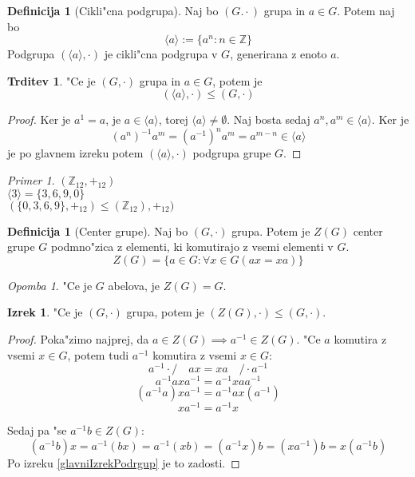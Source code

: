 \documentclass[11pt, a4paper]{article}
\theoremstyle{definition}
\newtheorem{defn}[counter]{Definicija}
\newtheorem{claim}[counter]{Trditev}
\newtheorem{theorem}[counter]{Izrek}
\theoremstyle{remark}
\newtheorem*{ex}{Primer}
\newtheorem*{rem}{Opomba}
\newcommand{\Z}{\mathbb{Z}}
\begin{document}
	\begin{defn}[Cikli"cna podgrupa]
		Naj bo $(G. \cdot)$ grupa in $a \in G$. Potem naj bo
		\[ \langle a \rangle := \lbrace a^n: n \in \Z \rbrace \]
		Podgrupa $(\langle a \rangle, \cdot)$ je cikli"cna podgrupa v $G$, generirana z enoto $a$.
	\end{defn}
	\begin{claim}
		"Ce je $(G, \cdot)$ grupa in $a \in G$, potem je
		\[ (\langle a \rangle, \cdot) \leq (G, \cdot) \]
	\end{claim}
	\begin{proof}
		Ker je $a^1 = a$, je $a \in \langle a \rangle$, torej $\langle a \rangle \neq \emptyset$. Naj bosta sedaj $a^n, a^m \in \langle a \rangle$.
		Ker je \[(a^n)^{-1}a^m = (a^{-1})^na^m = a^{m-n} \in \langle a \rangle \]
		je po glavnem izreku potem $(\langle a \rangle, \cdot)$ podgrupa grupe $G$.
	\end{proof}

	\begin{ex}
		$(\Z_{12}, +_{12})$
		\\
		$\langle 3 \rangle = \lbrace 3, 6, 9, 0 \rbrace$
		\\
		$(\lbrace 0, 3, 6, 9 \rbrace, +_{12}) \leq (\Z_{12}), +_{12})$
	\end{ex}

	\begin{defn}[Center grupe]
		Naj bo $(G, \cdot)$ grupa. Potem je $Z(G)$ center grupe $G$ podmno"zica z elementi, ki komutirajo z vsemi elementi v $G$.
		\[ Z(G) = \lbrace a \in G: \forall x \in G(ax=xa) \rbrace \]
	\end{defn}

	\begin{rem}
		"Ce je $G$ abelova, je $Z(G) = G$.
	\end{rem}
	\begin{theorem}
		"Ce je $(G, \cdot)$ grupa, potem je $(Z(G), \cdot) \leq (G, \cdot)$.
	\end{theorem}
	\begin{proof}		
		Poka"zimo najprej, da $a \in Z(G) \implies a^{-1} \in Z(G)$. "Ce $a$ komutira z vsemi $x \in G$, potem tudi $a^{-1}$ komutira z vsemi $x \in G$:
		\[ a^{-1} \cdot / \quad ax = xa \quad / \cdot a^{-1} \]
		\[ a^{-1}axa^{-1} = a^{-1}xaa^{-1} \]
		\[ (a^{-1}a)xa^{-1} = a^{-1}ax(a^{-1}) \]
		\[ xa^{-1} = a^{-1}x \]
		
		Sedaj pa "se $a^{-1}b \in Z(G)$:
		\[ (a^{-1}b)x = a^{-1}(bx) = a^{-1}(xb) = (a^{-1}x)b = (xa^{-1})b = x(a^{-1}b) \]
		Po izreku \ref{glavniIzrekPodrgup} je to zadosti.
	\end{proof}
\end{document}
